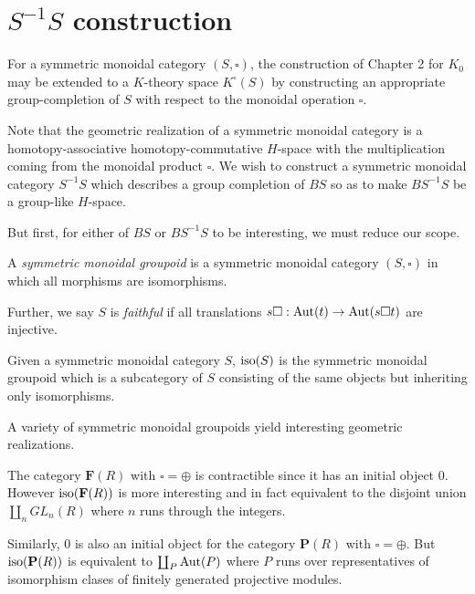 \section{$S^{-1}S$ construction}
For a symmetric monoidal category $(S, \square)$, the construction of Chapter 2 for $K_0$ may be extended to
a $K$-theory space $K^\square(S)$ by constructing an appropriate group-completion of $S$ with respect to the monoidal operation $\square$.

Note that the geometric realization of a symmetric monoidal category is a homotopy-associative homotopy-commutative $H$-space
with the multiplication coming from the monoidal product $\square$.
We wish to construct a symmetric monoidal category $S^{-1}S$ which describes a group completion of $BS$ so as to make $BS^{-1}S$ be a group-like $H$-space.
\cite{Grayson}

But first, for either of $BS$ or $BS^{-1}S$ to be interesting, we must reduce our scope.

\begin{definition}
A \emph{symmetric monoidal groupoid} is a symmetric monoidal category $(S,\square)$ in which all morphisms are isomorphisms.

Further, we say $S$ is \emph{faithful} if all translations $s \square : \operatorname*{Aut}(t) \to \operatorname*{Aut}(s \square t)$ are injective.
\end{definition}

\begin{definition}
Given a symmetric monoidal category $S$, $\operatorname*{iso}(S)$ is the symmetric monoidal groupoid which is a subcategory of $S$ consisting of the same objects but inheriting only isomorphisms.
\end{definition}
A variety of symmetric monoidal groupoids yield interesting geometric realizations.
\begin{example}
The category $\mathbf F(R)$ with $\square = \oplus$ is contractible since it has an initial object $0$. However $\operatorname*{iso}(\mathbf F(R))$
is more interesting and in fact equivalent to the disjoint union $\coprod_n GL_n(R)$ where $n$ runs through the integers.
\end{example}
\begin{example}
Similarly, $0$ is also an initial object for the category $\mathbf P(R)$ with $\square = \oplus$.
But $\operatorname*{iso}(\mathbf P(R))$ is equivalent to $\coprod_P \operatorname*{Aut}(P)$ where $P$ runs over representatives of isomorphism clases
of finitely generated projective modules.
\end{example}

